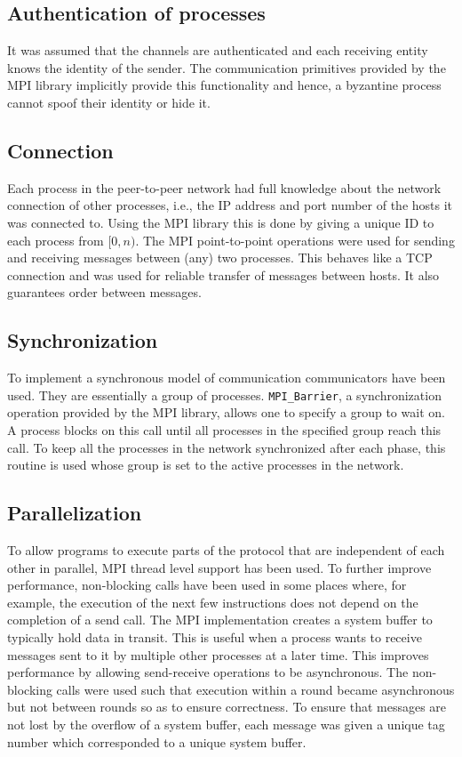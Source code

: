 \subsection{Authentication of processes}
It was assumed that the channels are authenticated and each receiving entity knows the identity of the sender. The communication primitives provided by the MPI library implicitly provide this functionality and hence, a byzantine process cannot spoof their identity or hide it.

\subsection{Connection}
Each process in the peer-to-peer network had full knowledge about the network connection of other processes, i.e., the IP address and port number of the hosts it was connected to. Using the MPI library this is done by giving a unique ID to each process from $[0, n)$. The MPI point-to-point operations were used for sending and receiving messages between (any) two processes. This behaves like a TCP connection and was used for reliable transfer of messages between hosts. It also guarantees order between messages.

\subsection{Synchronization}
To implement a synchronous model of communication communicators have been used. They are essentially a group of processes. \texttt{MPI\_Barrier}, a synchronization operation provided by the MPI library, allows one to specify a group to wait on. A process blocks on this call until all processes in the specified group reach this call. To keep all the processes in the network synchronized after each phase, this routine is used whose group is set to the active processes in the network.

\subsection{Parallelization}
To allow programs to execute parts of the protocol that are independent of each other in parallel, MPI thread level support has been used. To further improve performance, non-blocking calls have been used in some places where, for example, the execution of the next few instructions does not depend on the completion of a send call. The MPI implementation creates a system buffer to typically hold data in transit. This is useful when a process wants to receive messages sent to it by multiple other processes at a later time. This improves performance by allowing send-receive operations to be asynchronous. The non-blocking calls were used such that execution within a round became asynchronous but not between rounds so as to ensure correctness. To ensure that messages are not lost by the overflow of a system buffer, each message was given a unique tag number which corresponded to a unique system buffer.


